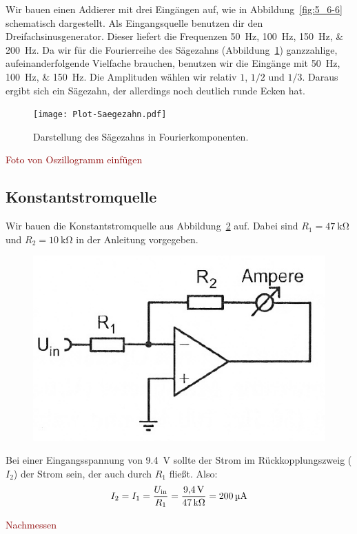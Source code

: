 Wir bauen einen Addierer mit drei Eingängen auf, wie in
Abbildung~\ref{fig:5_6-6} schematisch dargestellt. Als Eingangsquelle benutzen
dir den Dreifachsinusgenerator. Dieser liefert die Frequenzen
\SIlist{50;100;150;200}{\hertz}. Da wir für die Fourierreihe des Sägezahns
(Abbildung~\ref{fig:saegezahn}) ganzzahlige, aufeinanderfolgende Vielfache
brauchen, benutzen wir die Eingänge mit \SIlist{50;100;150}{\hertz}. Die
Amplituden wählen wir relativ $1$, $1/2$ und $1/3$. Daraus ergibt sich ein
Sägezahn, der allerdings noch deutlich runde Ecken hat.

\begin{figure}[htbp]
	\centering
	\texttt{[image: Plot-Saegezahn.pdf]}
	\caption{%
		Darstellung des Sägezahns in Fourierkomponenten.
	}
	\label{fig:saegezahn}
\end{figure}

\textcolor{darkred}{Foto von Oszillogramm einfügen}

\FloatBarrier
\subsection{Konstantstromquelle}

Wir bauen die Konstantstromquelle aus Abbildung~\ref{fig:5-1} auf. Dabei sind
$R_1 = \SI{47}{\kilo\ohm}$ und $R_2 = \SI{10}{\kilo\ohm}$ in der Anleitung
vorgegeben.

\begin{figure}[htbp]
	\centering
	\includegraphics[width=.6\linewidth]{Anleitung/5-1.png}
	\caption{%
		\cite[Abbildung~5.1]{physik313-Anleitung}
	}
	\label{fig:5-1}
\end{figure}

Bei einer Eingangsspannung von \SI{9.4}{\volt} sollte der Strom im
Rückkopplungszweig ($I_2$) der Strom sein, der auch durch $R_1$ fließt. Also:
\[
	I_2
	= I_1
	= \frac{U_\text{in}}{R_1}
	= \frac{\SI{9.4}\volt}{\SI{47}{\kilo\ohm}}
	= \SI{200}{\micro\ampere}
\]

\textcolor{darkred}{Nachmessen}

